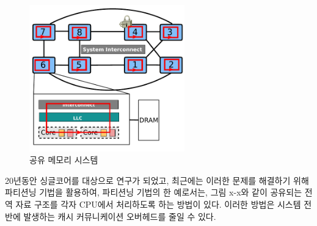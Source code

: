 \begin{figure}[h]
    \centering
    \includegraphics[width=0.6\textwidth]{fig/archcache_percore}
    \caption{공유 메모리 시스템}
  \label{shared_memory}
\end{figure}

20년동안 싱글코어를 대상으로 연구가 되었고, 최근에는 이러한 문제를 해결하기 위해 
파티션닝 기법을 활용하여, 파티션닝 기법의 한 예로서는, 그림 x-x와 같이 공유되는 
전역 자료 구조를 각자 CPU에서 처리하도록 하는 방법이 있다.  
이러한 방법은 시스템 전반에 발생하는 캐시 커뮤니케이션 오버헤드를 줄일 수 있다. 




%



